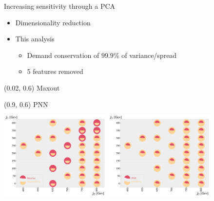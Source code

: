 \documentclass[UKenglish]{beamer}
\begin{document}
\begin{frame}{Increasing sensitivity through a PCA}
    \begin{itemize}
        \item Dimensionality reduction
        \item This analysis
        \begin{itemize}
            \item Demand conservation of $99.9\%$ of variance/spread
            \item 5 features removed
        \end{itemize}
    \end{itemize}
    \begin{textblock}{0.8}(0.02, 0.6)
        {Maxout}
    \end{textblock}
    \begin{textblock}{0.8}(0.9, 0.6)
        {PNN}
    \end{textblock}
    \vfill
    \begin{center}
        \includegraphics[width=0.415\textwidth]{figures/Comps/MaxOutPCANetworkComp.pdf}
        \includegraphics[width=0.415\textwidth]{figures/Comps/PNNPCANetworkComp.pdf}
    \end{center}
\end{frame}
\end{document}
